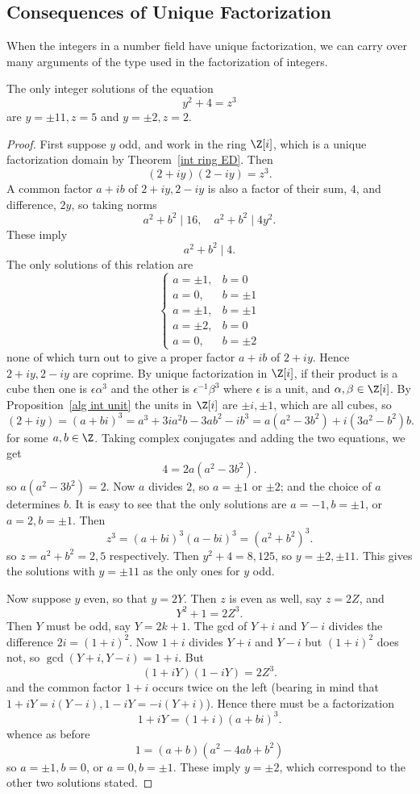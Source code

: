 \subsection{Consequences of Unique Factorization}
When the integers in a number field have unique factorization, we can carry over many arguments of the type used in the factorization of integers.
\begin{theorem}
The only integer solutions of the equation
\[y^2+4=z^3\]
are $y=\pm11,z=5$ and $y=\pm2,z=2$.
\end{theorem}
\begin{proof}
First suppose $y$ odd, and work in the ring $\Z[i]$, which is a unique factorization domain by Theorem~\ref{int ring ED}. Then 
\[(2+iy)(2-iy)=z^3.\]
A common factor $a+ib$ of $2+iy,2-iy$ is also a factor of their sum, $4$, and difference, $2y$, so taking norms
\[a^2+b^2\mid 16,\quad a^2+b^2\mid 4y^2.\]
These imply
\[a^2+b^2\mid 4.\]
The only solutions of this relation are 
\[\left\{\begin{array}{ll}
a=\pm1,&b=0\\
a=0,&b=\pm1\\
a=\pm1,&b=\pm1\\
a=\pm2,&b=0\\
a=0,&b=\pm2
\end{array}\right. \]
none of which turn out to give a proper factor $a+ib$ of $2+iy$. Hence $2+iy,2-iy$ are coprime. By unique factorization in $\Z[i]$, if their product is a cube then one is $\epsilon\alpha^3$ and the other is $\epsilon^{-1}\beta^3$ where $\epsilon$ is a unit, and $\alpha,\beta\in\Z[i]$. By Proposition~\ref{alg int unit} the units in $\Z[i]$ are $\pm i,\pm1$, which are all cubes, so
\[(2+iy)=(a+bi)^3=a^3+3ia^2b-3ab^2-ib^3=a(a^2-3b^2)+i(3a^2-b^2)b.\]
for some $a,b\in\Z$. Taking complex conjugates and adding the two equations, we get
\[4=2a(a^2-3b^2).\]
so $a(a^2-3b^2)=2$. Now $a$ divides $2$, so $a=\pm 1$ or $\pm2$; and the choice of $a$ determines $b$. It is easy to see that the only solutions are $a=-1,b=\pm1$, or $a=2,b=\pm1$. Then
\[z^3=(a+bi)^3(a-bi)^3=(a^2+b^2)^3.\]
so $z=a^2+b^2=2,5$ respectively. Then $y^2+4=8,125$, so $y=\pm2,\pm11$. This gives the solutions with $y=\pm11$ as the only ones for $y$ odd.\par
Now suppose $y$ even, so that $y=2Y$. Then $z$ is even as well, say $z=2Z$, and
\[Y^2+1=2Z^3.\]
Then $Y$ must be odd, say $Y=2k+1$. The gcd of $Y+i$ and $Y-i$ divides the difference $2i=(1+i)^2$. Now $1+i$ divides $Y+i$ and $Y-i$ but $(1+i)^2$ does not, so $\gcd(Y+i,Y-i)=1+i$. But
\[(1+iY)(1-iY)=2Z^3.\]
and the common factor $1+i$ occurs twice on the left (bearing in mind that $1+iY=i(Y-i),1-iY=-i(Y+i)$). Hence there must be a factorization
\[1+iY=(1+i)(a+bi)^3.\]
whence as before
\[1=(a+b)(a^2-4ab+b^2)\]
so $a=\pm1,b=0$, or $a=0,b=\pm1$. These imply $y=\pm2$, which correspond to the other two solutions stated.
\end{proof}
